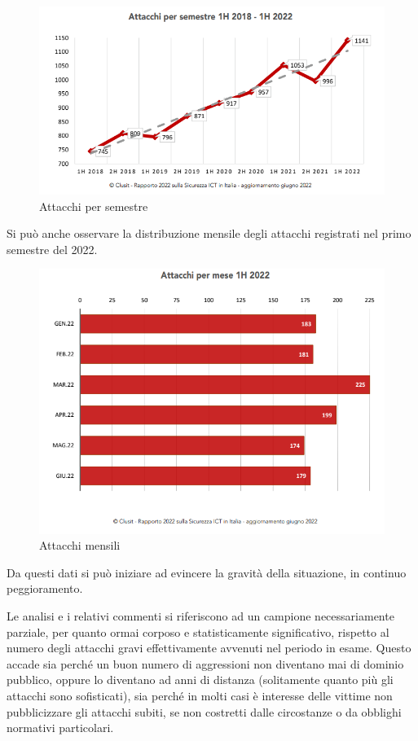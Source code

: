 \begin{figure}[H]
    \centering
    \includegraphics[scale=0.8]{Immagini/img1.png}
    \caption{Attacchi per semestre}
    \label{fig:AttacchiSemestre}
\end{figure}

Si può anche osservare la distribuzione mensile degli attacchi registrati nel primo semestre del 2022.

\begin{figure}[H]
    \centering
    \includegraphics[scale=0.8]{Immagini/img2.png}
    \caption{Attacchi mensili}
    \label{fig:AttacchiMensili}
\end{figure}

Da questi dati si può iniziare ad evincere la gravità della situazione, in continuo peggioramento.

Le analisi e i relativi commenti si riferiscono ad un campione necessariamente parziale, per quanto ormai corposo e statisticamente significativo, rispetto al numero degli attacchi gravi effettivamente avvenuti nel periodo in esame. Questo accade sia perché un buon numero di aggressioni non diventano mai di dominio pubblico, oppure lo diventano ad anni di distanza (solitamente quanto più gli attacchi sono sofisticati), sia perché in molti casi è interesse delle vittime non pubblicizzare gli attacchi subiti, se non costretti dalle circostanze o da obblighi normativi particolari.

